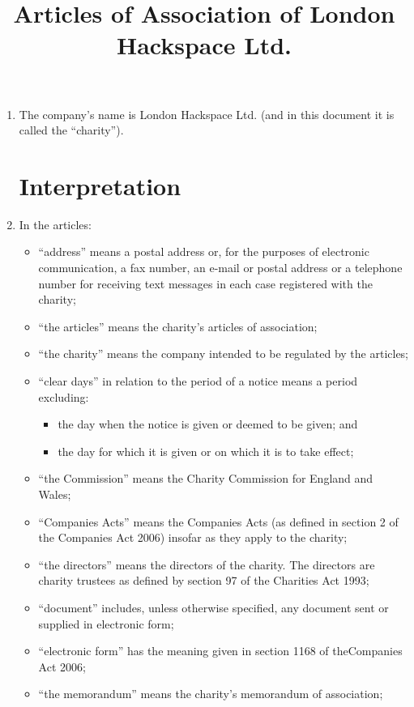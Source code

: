 \title{Articles of Association of London Hackspace Ltd.}
\begin{enumerate}
\item
  The company's name is London Hackspace Ltd. (and in this document
  it is called the ``charity'').

\section{Interpretation}

\item
  In the articles:
  \begin{itemize}
  \item
    ``address'' means a postal address or, for the purposes of
    electronic communication, a fax number, an e-mail or postal address
    or a telephone number for receiving text messages in each case
    registered with the charity;
  \item
    ``the articles'' means the charity's articles of association;
  \item
    ``the charity'' means the company intended to be regulated by the
    articles;
  \item
    ``clear days'' in relation to the period of a notice means a period
    excluding:
    \begin{itemize}
    \item
      the day when the notice is given or deemed to be given; and
    \item
      the day for which it is given or on which it is to take effect;
    \end{itemize}
  \item
    ``the Commission'' means the Charity Commission for England and
    Wales;
  \item
    ``Companies Acts'' means the Companies Acts (as defined in section
    2 of the Companies Act 2006) insofar as they apply to the charity;
  \item
    ``the directors'' means the directors of the charity. The directors
    are charity trustees as defined by section 97 of the Charities Act
    1993;
  \item
    ``document'' includes, unless otherwise specified, any document
    sent or supplied in electronic form;
  \item
    ``electronic form'' has the meaning given in section 1168 of
    theCompanies Act 2006;
  \item
    ``the memorandum'' means the charity's memorandum of association;

\end{itemize}
\end{enumerate}
